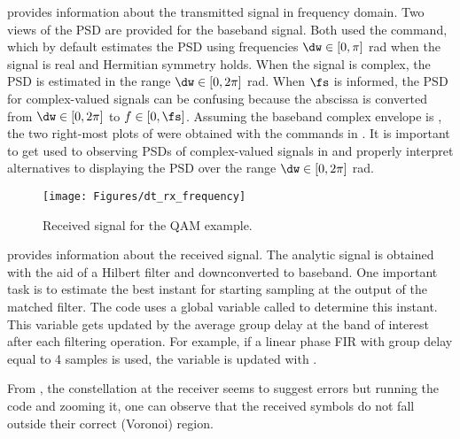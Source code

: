  provides information about the transmitted signal in frequency domain. Two views of the PSD are provided for the baseband signal. Both used the  command, which by default estimates the PSD using frequencies $\dw \in [0, \pi]$ rad when the signal is real and Hermitian symmetry holds. When the signal is complex, the PSD is estimated in the range $\dw \in [0, 2\pi]$ rad. When $\fs$ is informed, the PSD for complex-valued signals can be confusing because the abscissa is converted from $\dw \in [0, 2\pi]$ to $f \in [0, \fs]$. Assuming the baseband complex envelope is , the two right-most plots of  were obtained with the commands in .  It is important to get used to observing PSDs of complex-valued signals in {\matlab} and properly interpret alternatives to displaying the PSD over the range $\dw \in [0, 2\pi]$ rad.



\begin{figure}[htbp]
\centering
\texttt{[image: Figures/dt\_rx\_frequency]}
\caption{Received signal for the QAM example.\label{fig:dt_rx_frequency}}
\end{figure}

 provides information about the received signal. The analytic signal is obtained with the aid of a Hilbert filter and downconverted to baseband. One important task is to estimate the best instant for starting sampling at the output of the matched filter. The code uses a global variable called  to determine this instant. This variable gets updated by the average group delay at the band of interest after each filtering operation. For example, if a linear phase FIR with group delay equal to 4 samples is used, the variable is updated with .

From , the constellation at the receiver seems to suggest errors but running the code and zooming it, one can observe that the received symbols do not fall outside their correct (Voronoi) region.

